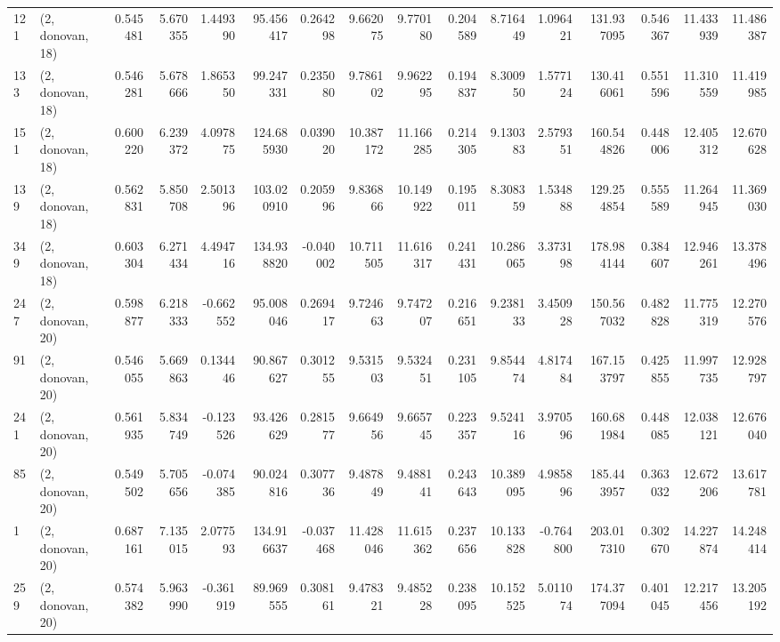 \begin{tabular}{llrrrrrrrrrrrrrr}
121 &  (2, donovan, 18) &   0.545481 &   5.670355 &   1.449390 &    95.456417 &   0.264298 &   9.662075 &   9.770180 &  0.204589 &   8.716449 &   1.096421 &   131.937095 &  0.546367 &  11.433939 &  11.486387 \\
133 &  (2, donovan, 18) &   0.546281 &   5.678666 &   1.865350 &    99.247331 &   0.235080 &   9.786102 &   9.962295 &  0.194837 &   8.300950 &   1.577124 &   130.416061 &  0.551596 &  11.310559 &  11.419985 \\
151 &  (2, donovan, 18) &   0.600220 &   6.239372 &   4.097875 &   124.685930 &   0.039020 &  10.387172 &  11.166285 &  0.214305 &   9.130383 &   2.579351 &   160.544826 &  0.448006 &  12.405312 &  12.670628 \\
139 &  (2, donovan, 18) &   0.562831 &   5.850708 &   2.501396 &   103.020910 &   0.205996 &   9.836866 &  10.149922 &  0.195011 &   8.308359 &   1.534888 &   129.254854 &  0.555589 &  11.264945 &  11.369030 \\
349 &  (2, donovan, 18) &   0.603304 &   6.271434 &   4.494716 &   134.938820 &  -0.040002 &  10.711505 &  11.616317 &  0.241431 &  10.286065 &   3.373198 &   178.984144 &  0.384607 &  12.946261 &  13.378496 \\
247 &  (2, donovan, 20) &   0.598877 &   6.218333 &  -0.662552 &    95.008046 &   0.269417 &   9.724663 &   9.747207 &  0.216651 &   9.238133 &   3.450928 &   150.567032 &  0.482828 &  11.775319 &  12.270576 \\
91  &  (2, donovan, 20) &   0.546055 &   5.669863 &   0.134446 &    90.867627 &   0.301255 &   9.531503 &   9.532451 &  0.231105 &   9.854474 &   4.817484 &   167.153797 &  0.425855 &  11.997735 &  12.928797 \\
241 &  (2, donovan, 20) &   0.561935 &   5.834749 &  -0.123526 &    93.426629 &   0.281577 &   9.664956 &   9.665745 &  0.223357 &   9.524116 &   3.970596 &   160.681984 &  0.448085 &  12.038121 &  12.676040 \\
85  &  (2, donovan, 20) &   0.549502 &   5.705656 &  -0.074385 &    90.024816 &   0.307736 &   9.487849 &   9.488141 &  0.243643 &  10.389095 &   4.985896 &   185.443957 &  0.363032 &  12.672206 &  13.617781 \\
1   &  (2, donovan, 20) &   0.687161 &   7.135015 &   2.077593 &   134.916637 &  -0.037468 &  11.428046 &  11.615362 &  0.237656 &  10.133828 &  -0.764800 &   203.017310 &  0.302670 &  14.227874 &  14.248414 \\
259 &  (2, donovan, 20) &   0.574382 &   5.963990 &  -0.361919 &    89.969555 &   0.308161 &   9.478321 &   9.485228 &  0.238095 &  10.152525 &   5.011074 &   174.377094 &  0.401045 &  12.217456 &  13.205192 \\

\end{tabular}
